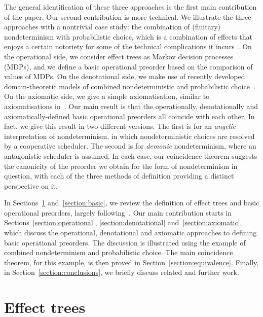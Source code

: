 \documentclass[a4paper,UKenglish]{lipics-v2018}
\theoremstyle{plain}
\begin{document}
The general identification of these three approaches is the first main contribution of the paper.
Our second contribution is more technical. We illustrate the three approaches
with a nontrivial case study: the combination of (finitary) nondeterminism with probabilistic choice, which is a combination of effects that enjoys a certain notoriety 
for some of the technical complications it incurs~\cite{Mislove2000,mislove2004axioms,VW06,tix2009semantic,JGL15,JGL-mscs16,KeimelP2016}.
On the operational side, we consider effect trees as Markov decision processes (MDPs), and we define a basic operational preorder based on the comparison of values of MDPs. On the denotational side, we make use of recently developed domain-theoretic models of combined nondeterministic and probabilistic choice~\cite{tix2009semantic,JGL-mscs16,KeimelP2016}.
On the axiomatic side, we give a simple axiomatisation, similar to axiomatisations in~\cite{mislove2004axioms,KeimelP2016}. 
Our main result is that the
operationally, denotationally and axiomatically-defined basic operational preorders all coincide with each other.
In fact, we give this result in two different versions.
The first is for an \emph{angelic} interpretation of nondeterminism, in which nondeterministic choices are resolved by a cooperative scheduler. The second is for \emph{demonic} nondeterminism, where an antagonistic scheduler is assumed. 
In each case, our coincidence theorem suggests the canonicity of the  preorder we obtain for the form of nondeterminism in question, with each of the three methods of definition providing a distinct perspective on it. 

In Sections~\ref{section:trees} and~\ref{section:basic}, we review the 
definition of effect trees and basic operational preorders, largely following~\cite{gom}. Our main contribution starts in Sections~\ref{section:operational}, \ref{section:denotational} and~\ref{section:axiomatic}, which discuss the 
operational, denotational and axiomatic approaches to defining basic operational preorders. The discussion is illustrated using the example of combined nondeterminism and probabilistic choice. 
The main coincidence theorem, for this example, is then proved in Section~\ref{section:equivalence}. Finally, in Section~\ref{section:conclusions}, we briefly discuss related and further work.

\section{Effect trees}
\label{section:trees}
\end{document}
